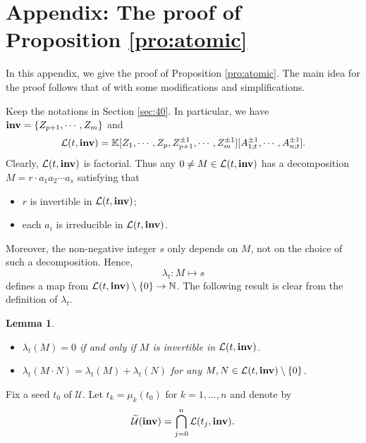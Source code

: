 \documentclass{amsart}
\newtheorem{lemma}[theorem]{Lemma}
\theoremstyle{definition}
\theoremstyle{remark}
\numberwithin{equation}{section}
\begin{document}
\section*{Appendix: The proof of Proposition \ref{pro:atomic}}\label{app}


In this appendix, we give the proof of Proposition \ref{pro:atomic}. The main idea for the proof follows that of \cite{GS_2022} with some modifications and simplifications.


Keep the notations in Section \ref{sec:40}. In particular, we have   ${\bf inv}=\{Z_{p+1},\cdots,Z_m\}$ and
$${\mathcal L}(t,{\bf inv})=\mathbb K[Z_1,\cdots,Z_p,Z_{p+1}^{\pm1},\cdots,Z_m^{\pm1}][A_{1;t}^{\pm1},\cdots,A_{n;t}^{\pm1}].$$
Clearly, ${\mathcal L}(t,{\bf inv})$ is factorial. Thus any  $0\neq M\in {\mathcal L}(t,{\bf inv})$ has a decomposition $M=r\cdot a_1a_2\cdots a_s$ satisfying that
\begin{itemize}
    \item $r$ is invertible in ${\mathcal L}(t,{\bf inv})$;
    \item each $a_i$ is irreducible in ${\mathcal L}(t,{\bf inv})$.
\end{itemize}
Moreover, the non-negative integer $s$ only depends on $M$, not on the choice of such a decomposition. Hence, $$\lambda_t:M\mapsto s$$ defines a map from ${\mathcal L}(t,{\bf inv})\setminus\{0\}\rightarrow \mathbb N$. The following result is clear from the definition of $\lambda_t$.

\begin{lemma}\label{lem:app1}
\begin{itemize}
    \item [(i)] $\lambda_t(M)=0$ if and only if $M$ is invertible in  ${\mathcal L}(t,{\bf inv})$.
    \item[(ii)] $\lambda_t(M\cdot N)=\lambda_t(M)+\lambda_t(N)$ for any  $M,N\in {\mathcal L}(t,{\bf inv})\setminus\{0\}$.
\end{itemize}
\end{lemma}

Fix a seed $t_0$ of $\mathcal U$. Let $t_k=\mu_k(t_0)$ for $k=1,\ldots,n$ and denote by
$$\widetilde {\mathcal U}({\bf inv})= \bigcap_{j=0}^n\mathcal L(t_j,{\bf inv}).$$
\end{document}
